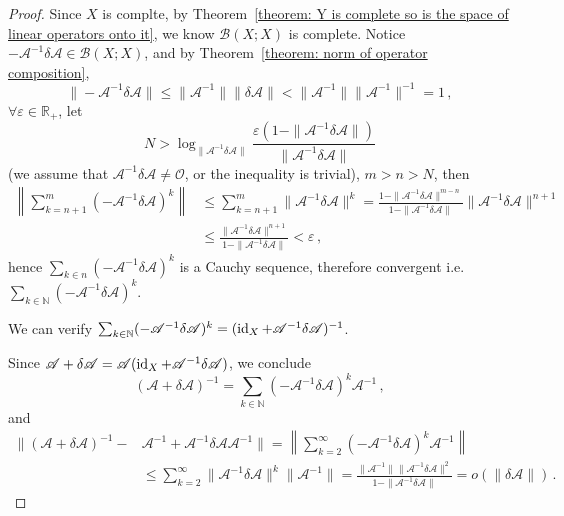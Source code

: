\documentclass[openany]{book}
\begin{document}
\begin{proof}
	Since $X$ is complte, by Theorem~\ref{theorem: Y is complete so is the space of linear operators onto it}, we know $\mathcal B(X; X)$ is complete.
	Notice $ - \mathscr A^{-1} \delta \mathscr A \in \mathcal B(X; X)$, and by Theorem~\ref{theorem: norm of operator composition},
	\begin{equation*}
		\| -\mathscr A^{-1} \delta \mathscr A\| 
		\leq \|\mathscr A^{-1}\| \|\delta \mathscr A\| 
		< \|\mathscr A^{-1}\| \|\mathscr A^{-1}\|^{-1} = 1\,,
	\end{equation*} 
	$\forall \varepsilon \in \mathbb R_+$, let
	\begin{equation*}
		N > \log_{\|\mathscr A^{-1} \delta \mathscr A\|} 
		\frac{\varepsilon (1 - \|\mathscr A^{-1} \delta \mathscr A\|)}{\|\mathscr A^{-1} \delta \mathscr A\|}
	\end{equation*}
	(we assume that $\mathscr A^{-1} \delta \mathscr A \neq \mathscr O$, or the inequality is trivial), $m > n > N$, then
	\begin{align*}
		\left\|
			\sum_{k = n + 1}^{m}(-\mathscr A^{-1} \delta \mathscr A )^k
		\right\| 
			&\leq \sum_{k = n + 1}^{m} \|\mathscr A^{-1} \delta \mathscr A \|^k
			= \frac{1 - \|\mathscr A^{-1} \delta \mathscr A\|^{m - n}}{1 - \|\mathscr A^{-1} \delta \mathscr A\|} \|\mathscr A^{-1} \delta \mathscr A\|^{n + 1}
			\\
			&\leq \frac{\|\mathscr A^{-1} \delta \mathscr A\|^{n + 1}}{1 - \|\mathscr A^{-1} \delta \mathscr A\|} < \varepsilon\,,
	\end{align*}
	hence $\sum_{k \in n} (- \mathscr A^{-1} \delta \mathscr A)^k$ is a Cauchy sequence, therefore convergent i.e. $\sum_{k \in \mathbb N} (- \mathscr A^{-1} \delta \mathscr A)^k$.

	We can verify $\sum_{k \in \mathbb N} (- \mathscr A^{-1} \delta \mathscr A)^k = (\operatorname{id}_X + \mathscr A^{-1} \delta \mathscr A)^{-1}$.

	Since $\mathscr A + \delta \mathscr A = \mathscr A (\operatorname{id}_X + \mathscr A^{-1} \delta \mathscr A)$, we conclude
	\begin{equation*}
		(\mathscr A + \delta \mathscr A)^{-1} 
		= \sum_{k \in \mathbb N} (- \mathscr A^{-1} \delta \mathscr A)^k \mathscr A^{-1}\,,
	\end{equation*}
	and
	\begin{align*}
		\|(\mathscr A + \delta \mathscr A)^{-1} -& \mathscr A^{-1} + \mathscr A^{-1} \delta \mathscr A \mathscr A^{-1}\| 
		= \left\|
			\sum_{k = 2}^{\infty} (- \mathscr A^{-1} \delta \mathscr A)^k \mathscr A^{-1}
		\right\| 
		\\
		&\leq
		\sum_{k = 2}^{\infty} \|\mathscr A^{-1} \delta \mathscr A\|^k \|\mathscr A^{-1}\| 
		= \frac{\|\mathscr A^{-1}\| \|\mathscr A^{-1} \delta \mathscr A\|^2}{1 - \|\mathscr A^{-1} \delta \mathscr A\|}
		= o(\|\delta \mathscr A\|)\,.
	\end{align*}
\end{proof}
\end{document}
